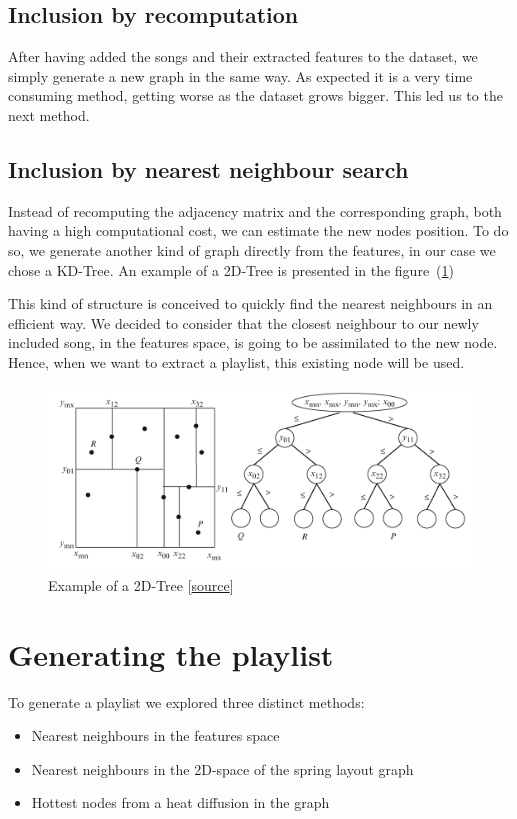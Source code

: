 \documentclass[11pt,a4paper,twoside]{article}
\begin{document}
\subsection{Inclusion by recomputation}
After having added the songs and their extracted features to the dataset, we simply generate a new graph in the same way. As expected it is a very time consuming method, getting worse as the dataset grows bigger. This led us to the next method. 

\subsection{Inclusion by nearest neighbour search}
Instead of recomputing the adjacency matrix and the corresponding graph, both having a high computational cost, we can estimate the new nodes position. To do so, we generate another kind of graph directly from the features, in our case we chose a KD-Tree.
An example of a 2D-Tree is presented in the figure~(\ref{fig:ex_tree})

This kind of structure is conceived to quickly find the nearest neighbours in an efficient way.
We decided to consider that the closest neighbour to our newly included song, in the features space, is going to be assimilated to the new node. Hence, when we want to extract a playlist, this existing node will be used. 

\begin{figure}[H]
  \centering
    \includegraphics[width=.7\textwidth]{./Figures/tree}
  \caption{Example of a 2D-Tree [\href{http://what-when-how.com/advanced-methods-in-computer-graphics/collision-detection-advanced-methods-in-computer-graphics-part-6/}{source}]}
  \label{fig:ex_tree}
\end{figure}

\section{Generating the playlist}

To generate a playlist we explored three distinct methods:
\begin{itemize}
\item Nearest neighbours in the features space
\item Nearest neighbours in the 2D-space of the spring layout graph 
\item Hottest nodes from a heat diffusion in the graph
\end{itemize}
\end{document}
